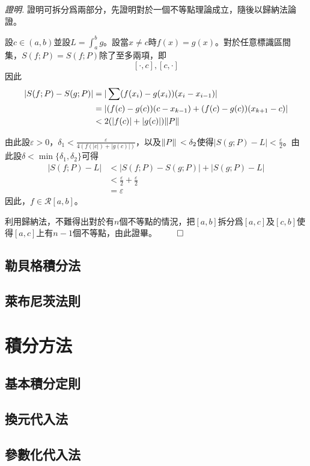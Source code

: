 \documentclass[12pt]{article}
\renewenvironment*{proof}{\textit{證明.}}{\hfill$\qed$}
\begin{document}
    \begin{proof}
        證明可拆分爲兩部分，先證明對於一個不等點理論成立，隨後以歸納法論證。

        設$c\in(a,b)$並設$L=\int_a^b g$。設當$x\neq c$時$f(x)=g(x)$。對於任意標識區間集，$S(f;P)=S(f;P)$除了至多兩項，即$$[\cdot,c], [c,\cdot]$$因此\begin{align*}
            |S(f;P)-S(g;P)|&=|\sum (f(x_i)-g(x_i))(x_i-x_{i-1})|\\
            &=|(f(c)-g(c))(c-x_{k-1})+(f(c)-g(c))(x_{k+1}-c)|\\
            &<2(|f(c)|+|g(c)|)\norm*{P}
        \end{align*}

        由此設$\varepsilon>0$，$\delta_1<\frac{\varepsilon}{4(f(|c|)+|g(c)|)}$，以及$\norm*{P}<\delta_2$使得$|S(g;P)-L|<\frac{\varepsilon}{2}$。由此設$\delta<\min\{\delta_1,\delta_2\}$可得\begin{align*}
            |S(f;P)-L|&<|S(f;P)-S(g;P)|+|S(g;P)-L|\\
            &<\frac{\varepsilon}{2}+\frac{\varepsilon}{2}\\
            &=\varepsilon
        \end{align*}
        因此，$f\in\mathcal{R}[a,b]$。

        利用歸納法，不難得出對於有$n$個不等點的情況，把$[a,b]$拆分爲$[a,c]$及$[c,b]$使得$[a,c]$上有$n-1$個不等點，由此證畢。
    \end{proof}
    \subsection*{勒貝格積分法}
    \subsection*{萊布尼茨法則}
    \section*{積分方法}
    \subsection*{基本積分定則}
    \subsection*{換元代入法}
    \subsection*{參數化代入法}
\end{document}
